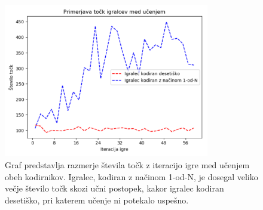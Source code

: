 \documentclass[a4paper, 12pt]{book}
\begin{document}
{\begin{figure}[h!]
	\begin{center}
		\includegraphics[width=0.8\textwidth]{photos/onehot_numeric_score.pdf}
	\end{center}
	\caption{Graf predstavlja razmerje števila točk z iteracijo igre med učenjem obeh kodirnikov.
		Igralec, kodiran z načinom 1-od-N, je dosegal veliko večje število točk skozi učni postopek, kakor igralec kodiran desetiško, pri katerem učenje ni potekalo uspešno.}
	\label{onehot_numeric_score}
\end{figure}

}
\end{document}
